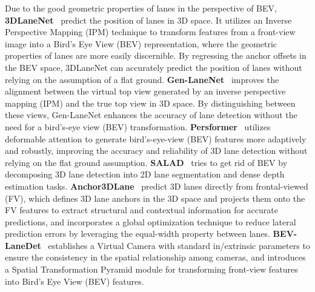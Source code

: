 Due to the good geometric properties of lanes in the perspective of BEV, \textbf{3DLaneNet}~\cite{garnett20193d} predict the position of lanes in 3D space.
It utilizes an Inverse Perspective Mapping (IPM) technique to transform features from a front-view image into a Bird's Eye View (BEV) representation,
where the geometric properties of lanes are more easily discernible.
By regressing the anchor offsets in the BEV space, 3DLaneNet can accurately predict the position of lanes without relying on the assumption of a flat ground.
\textbf{Gen-LaneNet}~\cite{guo2020gen} improves the alignment between the virtual top view generated by an inverse perspective mapping (IPM) and the true top view in 3D space.
By distinguishing between these views, Gen-LaneNet enhances the accuracy of lane detection without the need for a bird's-eye view (BEV) transformation.
\textbf{Persformer}~\cite{chen2022persformer} utilizes deformable attention to generate bird's-eye-view (BEV) features more adaptively and robustly, improving the accuracy and reliability of 3D lane detection without relying on the flat ground assumption.
\textbf{SALAD}~\cite{yan2022once} tries to get rid of BEV by decomposing 3D lane detection into 2D lane segmentation and dense depth estimation tasks.
\textbf{Anchor3DLane}~\cite{huang2023anchor3dlane} predict 3D lanes directly from frontal-viewed (FV), which defines 3D lane anchors in the 3D space and projects them onto the FV features to extract structural and contextual information for accurate predictions, and incorporates a global optimization technique to reduce lateral prediction errors by leveraging the equal-width property between lanes.
\textbf{BEV-LaneDet}~\cite{wang2023bev} establishes a Virtual Camera with standard in/extrinsic parameters to ensure the consistency in the spatial relationship among cameras, and introduces a Spatial Transformation Pyramid module for transforming front-view features into Bird's Eye View (BEV) features.